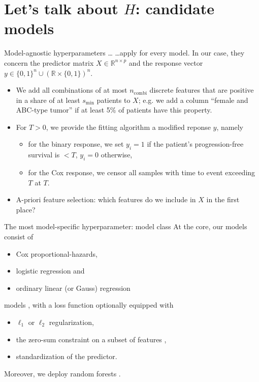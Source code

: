 \documentclass[10pt, aspectratio=169]{beamer}
\def\RR{\mathbb{R}}
\begin{document}
\section{Let's talk about $H$: candidate models}

\begin{frame}{Model-agnostic hyperparameters \ldots}
  \ldots apply for every model. In our case, they concern the predictor matrix 
  $X \in \RR^{n \times p}$ and the response vector $y \in \{ 0, 1 \}^n \cup 
  (\RR \times \{0, 1 \})^n$.

  \begin{itemize}
    \item We add all combinations of at most $n_{\text{combi}}$ discrete features 
      that are positive in a share of at least $s_{\text{min}}$ patients to $X$; e.g. 
      we add a column ``female and ABC-type tumor'' if at least 5\% of patients 
      have this property.
    \pause
    \item For $T > 0$, we provide the fitting algorithm a modified reponse $y$, namely
      \begin{itemize}
        \item for the binary response, we set $y_i = 1$ if the patient's progression-free 
          survival is $< T$, $y_i = 0$ otherwise,
        \item for the Cox response, we censor all samples with time to event 
          exceeding $T$ at $T$.
      \end{itemize}
    \pause
    \item A-priori feature selection: which features do we include in $X$ in the 
      first place?
  \end{itemize}
\end{frame}

\begin{frame}{The most model-specific hyperparameter: model class}
  At the core, our models consist of 
  \begin{itemize}
    \item Cox proportional-hazards,
    \item logistic regression and 
    \item ordinary linear (or Gauss) regression 
  \end{itemize}
  models \cite{zerosumR}, \pause with a loss function optionally equipped with
  \begin{itemize}
    \item $\ell_1$ or $\ell_2$ regularization,
    \item the zero-sum constraint on a subset of features \cite{transplatform17},
    \item standardization of the predictor.
  \end{itemize}

  \pause
  Moreover, we deploy random forests \cite{ranger-gh}.
\end{frame}
\end{document}

